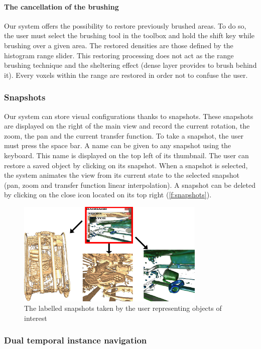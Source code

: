 \paragraph{The cancellation of the brushing}
Our system offers the possibility to restore previously brushed areas. To do so, the user must select the brushing tool in the toolbox and hold the shift key while brushing over a given area. The restored densities are those defined by the histogram range slider. This restoring processing does not act as the range brushing technique and the sheltering effect (dense layer provides to brush behind it). Every voxels within the range are restored in order not to confuse the user.

\subsubsection{Snapshots}
Our system can store visual configurations thanks to snapshots. These snapshots are displayed on the right of the main view and record the current rotation, the zoom, the pan and the current transfer function.
To take a snapshot, the user must press the space bar. A name can be given to any snapshot using the keyboard. This name is displayed on the top left of its thumbnail. The user can restore a saved object by clicking on its snapshot. When a snapshot is selected, the system animates the view from its current state to the selected snapshot (pan, zoom and transfer function linear interpolation). A snapshot can be deleted by clicking on the close icon located on its top right (\autoref{f:snapshots}).
 \begin{figure}
 \centering
	\includegraphics[width=9cm]{Figures/snapshots.png}
	\caption{ The labelled snapshots taken by the user representing objects of interest}
	\label{f:snapshots}
\end{figure}

\subsubsection{Dual temporal instance navigation}

